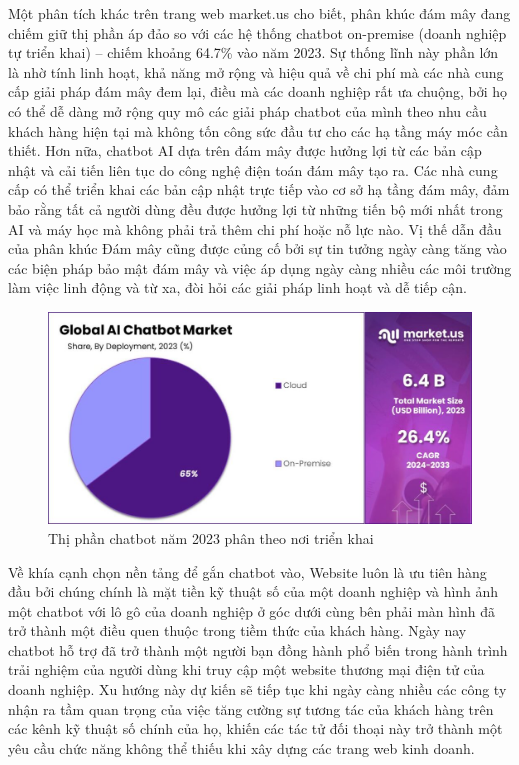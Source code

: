 Một phân tích khác trên trang web market.us cho biết, phân khúc đám mây đang chiếm giữ thị phần áp đảo so với các hệ thống chatbot on-premise (doanh nghiệp tự triển khai) – chiếm khoảng 64.7\% vào năm 2023. Sự thống lĩnh này phần lớn là nhờ tính linh hoạt, khả năng mở rộng và hiệu quả về chi phí mà các nhà cung cấp giải pháp đám mây đem lại, điều mà các doanh nghiệp rất ưa chuộng, bởi họ có thể dễ dàng mở rộng quy mô các giải pháp chatbot của mình theo nhu cầu khách hàng hiện tại mà không tốn công sức đầu tư cho các hạ tầng máy móc cần thiết. Hơn nữa, chatbot AI dựa trên đám mây được hưởng lợi từ các bản cập nhật và cải tiến liên tục do công nghệ điện toán đám mây tạo ra. Các nhà cung cấp có thể triển khai các bản cập nhật trực tiếp vào cơ sở hạ tầng đám mây, đảm bảo rằng tất cả người dùng đều được hưởng lợi từ những tiến bộ mới nhất trong AI và máy học mà không phải trả thêm chi phí hoặc nỗ lực nào. Vị thế dẫn đầu của phân khúc Đám mây cũng được củng cố bởi sự tin tưởng ngày càng tăng vào các biện pháp bảo mật đám mây và việc áp dụng ngày càng nhiều các môi trường làm việc linh động và từ xa, đòi hỏi các giải pháp linh hoạt và dễ tiếp cận.

\newpage

\begin{figure}[!ht]
    \centering
    \includegraphics[width=\linewidth]{Images/P1/da3.jpg}
    \vspace{0.5cm}
    \caption{Thị phần chatbot năm 2023 phân theo nơi triển khai}
\end{figure}

Về khía cạnh chọn nền tảng để gắn chatbot vào, Website luôn là ưu tiên hàng đầu bởi chúng chính là mặt tiền kỹ thuật số của một doanh nghiệp và hình ảnh một chatbot với lô gô của doanh nghiệp ở góc dưới cùng bên phải màn hình đã trở thành một điều quen thuộc trong tiềm thức của khách hàng. Ngày nay chatbot hỗ trợ đã trở thành một người bạn đồng hành phổ biến trong hành trình trải nghiệm của người dùng khi truy cập một website thương mại điện tử của doanh nghiệp. Xu hướng này dự kiến sẽ tiếp tục khi ngày càng nhiều các công ty nhận ra tầm quan trọng của việc tăng cường sự tương tác của khách hàng trên các kênh kỹ thuật số chính của họ, khiến các tác tử đối thoại này trở thành một yêu cầu chức năng không thể thiếu khi xây dựng các trang web kinh doanh.

